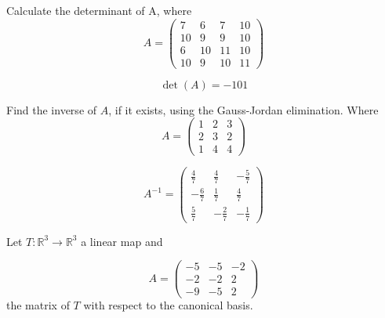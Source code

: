 \begin{questions}

\question Calculate the determinant of A, where
$$
A=\left(\begin{array}{rrrr}
7 & 6 & 7 & 10 \\
10 & 9 & 9 & 10 \\
6 & 10 & 11 & 10 \\
10 & 9 & 10 & 11
\end{array}\right)
$$

\begin{solution}
$$\det(A)=-101$$
\end{solution}

\question Find the inverse of $A$, if it exists, using the Gauss-Jordan elimination. Where
$$
A=\left(\begin{array}{rrr}
1 & 2 & 3 \\
2 & 3 & 2 \\
1 & 4 & 4
\end{array}\right)
$$

\begin{solution}
$$A^{-1}=\left(\begin{array}{rrr}
\frac{4}{7} & \frac{4}{7} & -\frac{5}{7} \\
-\frac{6}{7} & \frac{1}{7} & \frac{4}{7} \\
\frac{5}{7} & -\frac{2}{7} & -\frac{1}{7}
\end{array}\right)$$
\end{solution}

\question Let $T:\mathbb{R}^3\rightarrow\mathbb{R}^3$  a linear map and
 
$$
A=\left(\begin{array}{rrr}
-5 & -5 & -2 \\
-2 & -2 & 2 \\
-9 & -5 & 2
\end{array}\right)
$$
the matrix of $T$ with respect to the canonical basis.
\end{questions}
